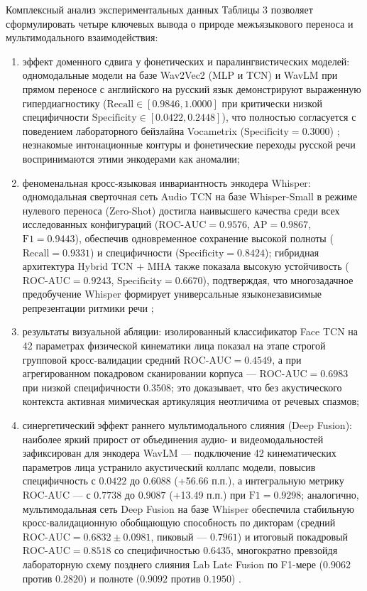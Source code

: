 \documentclass[a4paper,14pt]{extarticle}
\begin{document}
	Комплексный анализ экспериментальных данных Таблицы 3 позволяет сформулировать четыре ключевых вывода о природе межъязыкового переноса и мультимодального взаимодействия:
	\begin{enumerate}
		\item эффект доменного сдвига у фонетических и паралингвистических моделей: одномодальные модели на базе Wav2Vec2 (MLP и TCN) и WavLM при прямом переносе с английского на русский язык демонстрируют выраженную гипердиагностику ($\text{Recall} \in [0.9846, 1.0000]$ при критически низкой специфичности $\text{Specificity} \in [0.0422, 0.2448]$), что полностью согласуется с поведением лабораторного бейзлайна Vocametrix ($\text{Specificity} = 0.3000$) \cite{ivankin}; незнакомые интонационные контуры и фонетические переходы русской речи воспринимаются этими энкодерами как аномалии;
		\item феноменальная кросс-языковая инвариантность энкодера Whisper: одномодальная сверточная сеть Audio TCN на базе Whisper-Small в режиме нулевого переноса (Zero-Shot) достигла наивысшего качества среди всех исследованных конфигураций ($\text{ROC-AUC} = 0.9576$, $\text{AP} = 0.9867$, $\text{F1} = 0.9443$), обеспечив одновременное сохранение высокой полноты ($\text{Recall} = 0.9331$) и специфичности ($\text{Specificity} = 0.8424$); гибридная архитектура Hybrid TCN + MHA также показала высокую устойчивость ($\text{ROC-AUC} = 0.9243$, $\text{Specificity} = 0.6670$), подтверждая, что многозадачное предобучение Whisper формирует универсальные языконезависимые репрезентации ритмики речи \cite{whisper};
		\item результаты визуальной абляции: изолированный классификатор Face TCN на 42 параметрах физической кинематики лица показал на этапе строгой групповой кросс-валидации средний $\text{ROC-AUC} = 0.4549$, а при агрегированном покадровом сканировании корпуса — $\text{ROC-AUC} = 0.6983$ при низкой специфичности $0.3508$; это доказывает, что без акустического контекста активная мимическая артикуляция неотличима от речевых спазмов;
		\item синергетический эффект раннего мультимодального слияния (Deep Fusion): наиболее яркий прирост от объединения аудио- и видеомодальностей зафиксирован для энкодера WavLM — подключение 42 кинематических параметров лица устранило акустический коллапс модели, повысив специфичность с $0.0422$ до $0.6088$ (+56.66 п.п.), а интегральную метрику ROC-AUC — с $0.7738$ до $0.9087$ (+13.49 п.п.) при $\text{F1} = 0.9298$; аналогично, мультимодальная сеть Deep Fusion на базе Whisper обеспечила стабильную кросс-валидационную обобщающую способность по дикторам (средний $\text{ROC-AUC} = 0.6832 \pm 0.0981$, пиковый — $0.7961$) и итоговый покадровый $\text{ROC-AUC} = 0.8518$ со специфичностью $0.6435$, многократно превзойдя лабораторную схему позднего слияния Lab Late Fusion по F1-мере ($0.9062$ против $0.2820$) и полноте ($0.9092$ против $0.1950$) \cite{ivankin}.
	\end{enumerate}
\end{document}
